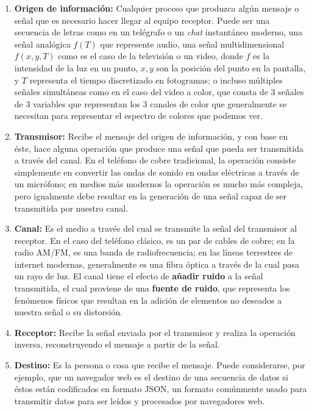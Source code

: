 \documentclass[spanish]{article}
\begin{document}
\begin{enumerate}
    \item \textbf{Origen de información:} Cualquier proceso que produzca algún mensaje o señal que es necesario hacer llegar al equipo receptor. Puede ser una secuencia de letras como en un telégrafo o un \textit{chat} instantáneo moderno, una señal analógica $f(T)$ que represente audio, una señal multidimensional $f(x,y,T)$ como es el caso de la televisión o un video, donde $f$ es la intensidad de la luz en un punto, $x,y$ son la posición del punto en la pantalla, y $T$ representa el tiempo discretizado en fotogramas; o incluso múltiples señales simultáneas como en el caso del video a color, que consta de 3 señales de 3 variables que representan los 3 canales de color que generalmente se necesitan para representar el espectro de colores que podemos ver.
    \item \textbf{Transmisor:} Recibe el mensaje del origen de información, y con base en éste, hace alguna operación que produce una señal que pueda ser transmitida a través del canal. En el teléfono de cobre tradicional, la operación consiste simplemente en convertir las ondas de sonido en ondas eléctricas a través de un micrófono; en medios más modernos la operación es mucho más compleja, pero igualmente debe resultar en la generación de una señal capaz de ser transmitida por nuestro canal.
    \item \textbf{Canal:} Es el medio a través del cual se transmite la señal del transmisor al receptor. En el caso del teléfono clásico, es un par de cables de cobre; en la radio AM/FM, es una banda de radiofrecuencia; en las líneas terrestres de internet modernas, generalmente es una fibra óptica a través de la cual pasa un rayo de luz. El canal tiene el efecto de \textbf{añadir ruido} a la señal transmitida, el cual proviene de una \textbf{fuente de ruido}, que representa los fenómenos físicos que resultan en la adición de elementos no deseados a nuestra señal o su distorsión.
    \item \textbf{Receptor:} Recibe la señal enviada por el transmisor y realiza la operación inversa, reconstruyendo el mensaje a partir de la señal.
    \item \textbf{Destino:} Es la persona o cosa que recibe el mensaje. Puede considerarse, por ejemplo, que un navegador web es el destino de una secuencia de datos si éstos están codificados en formato JSON, un formato comúnmente usado para transmitir datos para ser leídos y procesados por navegadores web.
\end{enumerate}
\end{document}
